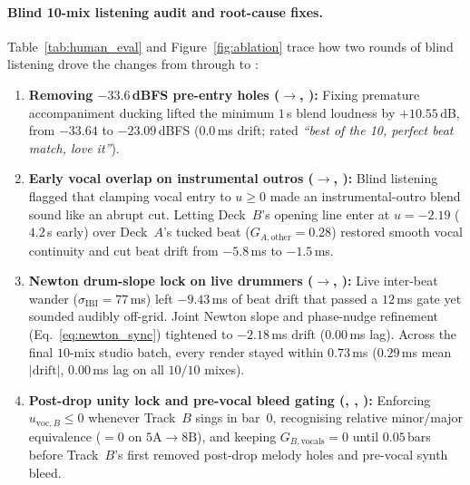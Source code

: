 \paragraph{Blind 10-mix listening audit and root-cause fixes.}
Table~\ref{tab:human_eval} and Figure~\ref{fig:ablation} trace how two rounds of blind listening drove the changes from  through  to :
\begin{enumerate}
  \item \textbf{Removing $-33.6$\,dBFS pre-entry holes ($\to$, ):} Fixing premature accompaniment ducking lifted the minimum $1$\,s blend loudness by $+10.55$\,dB, from $-33.64$ to $-23.09$\,dBFS ($0.0$\,ms drift; rated \emph{``best of the 10, perfect beat match, love it''}).
  \item \textbf{Early vocal overlap on instrumental outros ($\to$, ):} Blind listening flagged that clamping  vocal entry to $u \ge 0$ made an instrumental-outro blend sound like an abrupt cut. Letting Deck~$B$'s opening line enter at $u=-2.19$ ($4.2$\,s early) over Deck~$A$'s tucked beat ($G_{A,\text{other}}=0.28$) restored smooth vocal continuity and cut beat drift from $-5.8$\,ms to $-1.5$\,ms.
  \item \textbf{Newton drum-slope lock on live drummers ($\to$, ):} Live inter-beat wander ($\sigma_{\text{IBI}}=77$\,ms) left $-9.43$\,ms of beat drift that passed a $12$\,ms gate yet sounded audibly off-grid. Joint Newton slope and phase-nudge refinement (Eq.~\eqref{eq:newton_sync}) tightened  to $-2.18$\,ms drift ($0.00$\,ms lag). Across the final $10$-mix  studio batch, every render stayed within $0.73$\,ms ($0.29$\,ms mean $|\text{drift}|$, $0.00$\,ms lag on all $10/10$ mixes).
  \item \textbf{Post-drop unity lock and pre-vocal bleed gating (, , ):} Enforcing $u_{\text{voc},B} \le 0$ whenever Track~$B$ sings in bar~$0$, recognising relative minor/major equivalence ($=0$ on $5\text{A}\to 8\text{B}$), and keeping $G_{B,\text{vocals}}=0$ until $0.05$\,bars before Track~$B$'s first  removed post-drop melody holes and pre-vocal synth bleed.

\end{enumerate}
